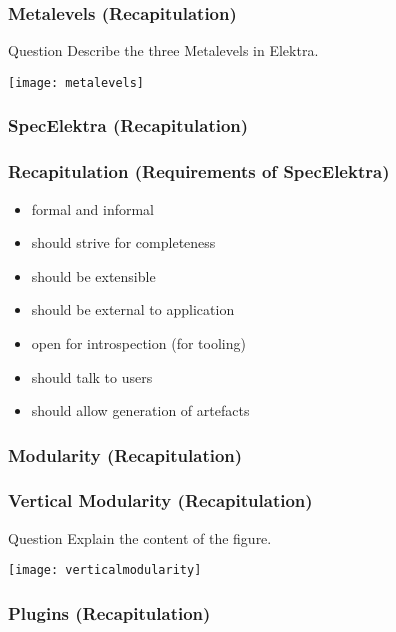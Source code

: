 \begin{frame}
	\frametitle{Metalevels (Recapitulation)}
	\begin{alertblock}{Question}
	Describe the three Metalevels in Elektra.
	\end{alertblock}

	\pause
	\texttt{[image: metalevels]}
\end{frame}

\begin{frame}
	\frametitle{SpecElektra (Recapitulation)}
	\pause

	\fontsize{18}{0}\selectfont
\end{frame}

\begin{frame}
	\frametitle{Recapitulation (Requirements of SpecElektra)}

	\pause
	\begin{itemize}
	\item formal and informal
	\item should strive for completeness
	\item should be extensible
	\item should be external to application
	\item open for introspection (for tooling)
	\item should talk to users
	\item should allow generation of artefacts
	\end{itemize}
\end{frame}

\begin{frame}
	\frametitle{Modularity (Recapitulation)}
	\pause
	\Large
\end{frame}

\begin{frame}
	\frametitle{Vertical Modularity (Recapitulation)}
	\begin{alertblock}{Question}
	Explain the content of the figure.
	\end{alertblock}
	\texttt{[image: verticalmodularity]}
\end{frame}

\begin{frame}
	\frametitle{Plugins (Recapitulation)}
	\pause
	\Large
\end{frame}


